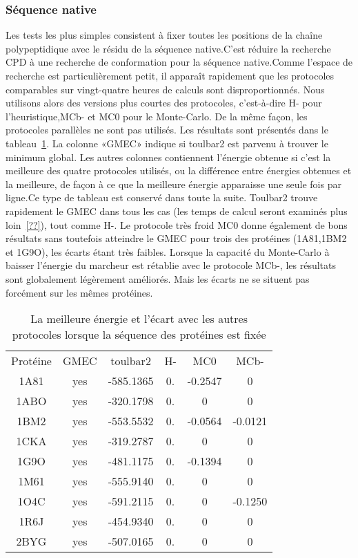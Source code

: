    \subsubsection{Séquence native}
Les tests les plus simples consistent à fixer toutes les positions de la chaîne polypeptidique avec le résidu de la séquence native.C'est réduire la recherche  CPD à une recherche de conformation pour la séquence native.Comme l'espace de recherche est particulièrement petit, il apparaît rapidement que les protocoles comparables sur vingt-quatre heures de calculs sont disproportionnés. Nous utilisons alors des versions plus courtes des protocoles, c'est-à-dire H- pour l'heuristique,MCb- et MC0 pour le Monte-Carlo. De la même façon, les protocoles parallèles ne sont pas utilisés. Les résultats sont présentés dans le tableau~\ref{tab:result_no_active}. La colonne «GMEC» indique si toulbar2 est parvenu à trouver le minimum global. Les autres colonnes contiennent l'énergie obtenue si c'est la meilleure des quatre protocoles utilisés, ou la différence entre énergies obtenues et la meilleure, de façon à ce que la meilleure énergie apparaisse une seule fois par ligne.Ce type de tableau est conservé dans toute la suite.  
Toulbar2  trouve rapidement le GMEC dans tous les cas (les temps de calcul seront examinés plus loin~\ref{??}), tout comme H-. Le protocole très froid MC0 donne également de bons résultats sans toutefois atteindre le GMEC pour trois des protéines (1A81,1BM2 et 1G9O), les écarts étant très faibles. Lorsque la capacité du Monte-Carlo à baisser l'énergie du marcheur est rétablie avec le protocole MCb-, les résultats sont globalement légèrement améliorés. Mais les écarts ne se situent pas forcément sur les mêmes protéines.
    \begin{table}[h]
      \centering

      \begin{tabular}{cccccc}

        \toprule
        Protéine & GMEC & toulbar2 & H- & MC0 & MCb- \\
        \cmidrule{1-6}
        1A81 & yes & -585.1365 & 0. & -0.2547 & 0 \\
        1ABO & yes & -320.1798 & 0. & 0 & 0 \\
        1BM2 & yes & -553.5532 & 0. & -0.0564 & -0.0121 \\
        1CKA & yes & -319.2787 & 0. & 0 & 0 \\
        1G9O & yes & -481.1175 & 0. & -0.1394 & 0 \\
        1M61 & yes & -555.9140 & 0. & 0 & 0 \\
        1O4C & yes & -591.2115 & 0. & 0 & -0.1250 \\
        1R6J & yes & -454.9340 & 0. & 0 & 0 \\
        2BYG & yes & -507.0165 & 0. & 0 & 0 \\        
        \bottomrule


      \end{tabular}      
      \caption{La meilleure énergie et l'écart avec les autres protocoles lorsque la séquence des protéines est fixée}
\label{tab:result_no_active}      
    \end{table}

